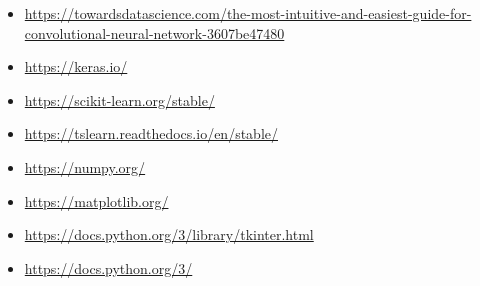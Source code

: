 \documentclass[10pt,a4paper]{article}
\begin{document}
\begin{itemize}
\item \textcolor{blue}{\url{https://towardsdatascience.com/the-most-intuitive-and-easiest-guide-for-convolutional-neural-network-3607be47480}}
\item \textcolor{blue}{\url{https://keras.io/}}
\item \textcolor{blue}{\url{https://scikit-learn.org/stable/}}
\item \textcolor{blue}{\url{https://tslearn.readthedocs.io/en/stable/}}
\item \textcolor{blue}{\url{https://numpy.org/}}
\item \textcolor{blue}{\url{https://matplotlib.org/}}
\item \textcolor{blue}{\url{https://docs.python.org/3/library/tkinter.html}}
\item \textcolor{blue}{\url{https://docs.python.org/3/}}

\end{itemize}
\end{document}
